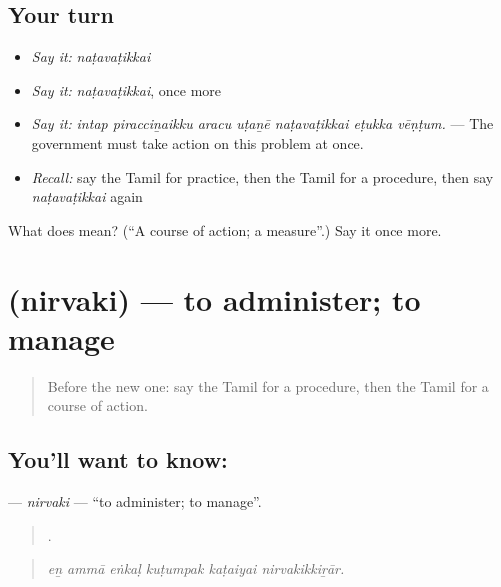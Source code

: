 \subsection*{Your turn}
\begin{itemize}
\raggedright
  \item \emph{Say it:} \emph{naṭavaṭikkai}
  \item \emph{Say it:} \emph{naṭavaṭikkai}, once more
  \item \emph{Say it:} \emph{intap piracciṉaikku aracu uṭaṉē naṭavaṭikkai eṭukka vēṇṭum.} — The government must take action on this problem at once.
  \item \emph{Recall:} say the Tamil for practice, then the Tamil for a procedure, then say \emph{naṭavaṭikkai} again
\end{itemize}

\begin{tcolorbox}[breakable,colback=teal!4,colframe=teal!35!black,title={Before you move on}]
What does  mean? (\textquotedblleft{}A course of action; a measure\textquotedblright{}.) Say it once more.
\end{tcolorbox}
\section[\texorpdfstring{\ta{நிர்வகி} (nirvaki)}{நிர்வகி (nirvaki)}]{ (nirvaki) — to administer; to manage}

\label{lesson:TA-C389-nirvaki}



\begin{quote}
Before the new one: say the Tamil for a procedure, then the Tamil for a course of action.
\end{quote}

\subsection*{You'll want to know: }
\textbf{} — \emph{nirvaki} — \textquotedblleft{}to administer; to manage\textquotedblright{}.

\begin{quote}
     .
\end{quote}

\begin{quote}
\emph{eṉ ammā eṅkaḷ kuṭumpak kaṭaiyai nirvakikkiṟār.}
\end{quote}

